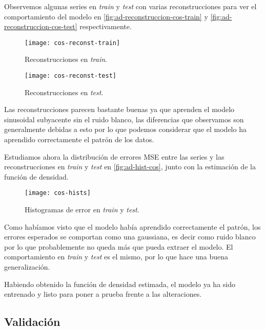 Observemos algunas series en \emph{train} y \emph{test} con varias reconstrucciones para ver el comportamiento del modelo en \autoref{fig:ad-reconstruccion-cos-train} y \autoref{fig:ad-reconstruccion-cos-test} respectivamente.

\begin{figure}[htpb]
  \centering
  \texttt{[image: cos-reconst-train]}
  \caption{Reconstrucciones en \emph{train}.}
  \label{fig:ad-reconstruccion-cos-train}
\end{figure}

\begin{figure}[htpb]
  \centering
  \texttt{[image: cos-reconst-test]}
  \caption{Reconstrucciones en \emph{test}.}
  \label{fig:ad-reconstruccion-cos-test}
\end{figure}

Las reconstrucciones parecen bastante buenas ya que aprenden el modelo sinusoidal subyacente sin el ruido blanco, las diferencias que observamos son generalmente debidas a esto por lo que podemos considerar que el modelo ha aprendido correctamente el patrón de los datos.

Estudiamos ahora la distribución de errores MSE entre las series y las reconstrucciones en \emph{train} y \emph{test} en \autoref{fig:ad-hist-cos}, junto con la estimación de la función de densidad.

\begin{figure}[htpb]
  \centering
  \texttt{[image: cos-hists]}
  \caption{Histogramas de error en \emph{train} y \emph{test}.}
  \label{fig:ad-hist-cos}
\end{figure}

Como habíamos visto que el modelo había aprendido correctamente el patrón, los errores esperados se comportan como una gaussiana, es decir como ruido blanco por lo que probablemente no queda más que pueda extraer el modelo. El comportamiento en \emph{train} y \emph{test} es el mismo, por lo que hace una buena generalización.

Habiendo obtenido la función de densidad estimada, el modelo ya ha sido entrenado y listo para poner a prueba frente a las alteraciones.

\subsection{Validación}

